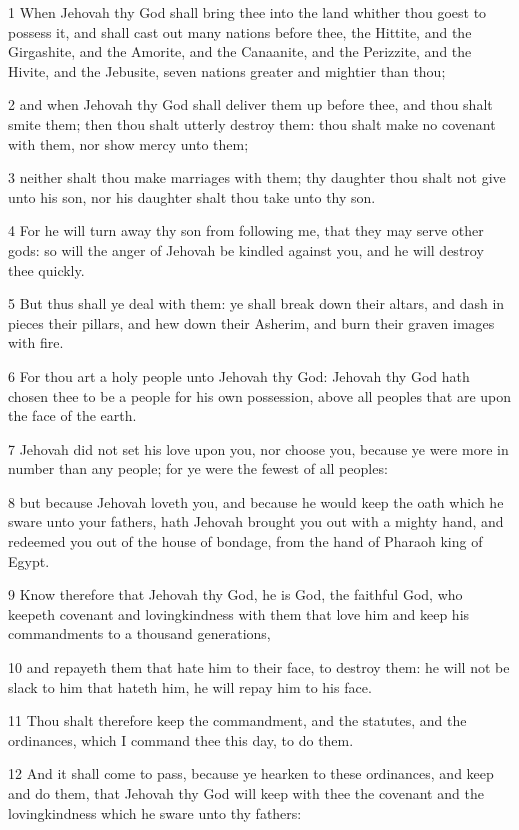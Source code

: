 \par 1 When Jehovah thy God shall bring thee into the land whither thou goest to possess it, and shall cast out many nations before thee, the Hittite, and the Girgashite, and the Amorite, and the Canaanite, and the Perizzite, and the Hivite, and the Jebusite, seven nations greater and mightier than thou;
\par 2 and when Jehovah thy God shall deliver them up before thee, and thou shalt smite them; then thou shalt utterly destroy them: thou shalt make no covenant with them, nor show mercy unto them;
\par 3 neither shalt thou make marriages with them; thy daughter thou shalt not give unto his son, nor his daughter shalt thou take unto thy son.
\par 4 For he will turn away thy son from following me, that they may serve other gods: so will the anger of Jehovah be kindled against you, and he will destroy thee quickly.
\par 5 But thus shall ye deal with them: ye shall break down their altars, and dash in pieces their pillars, and hew down their Asherim, and burn their graven images with fire.
\par 6 For thou art a holy people unto Jehovah thy God: Jehovah thy God hath chosen thee to be a people for his own possession, above all peoples that are upon the face of the earth.
\par 7 Jehovah did not set his love upon you, nor choose you, because ye were more in number than any people; for ye were the fewest of all peoples:
\par 8 but because Jehovah loveth you, and because he would keep the oath which he sware unto your fathers, hath Jehovah brought you out with a mighty hand, and redeemed you out of the house of bondage, from the hand of Pharaoh king of Egypt.
\par 9 Know therefore that Jehovah thy God, he is God, the faithful God, who keepeth covenant and lovingkindness with them that love him and keep his commandments to a thousand generations,
\par 10 and repayeth them that hate him to their face, to destroy them: he will not be slack to him that hateth him, he will repay him to his face.
\par 11 Thou shalt therefore keep the commandment, and the statutes, and the ordinances, which I command thee this day, to do them.
\par 12 And it shall come to pass, because ye hearken to these ordinances, and keep and do them, that Jehovah thy God will keep with thee the covenant and the lovingkindness which he sware unto thy fathers:
